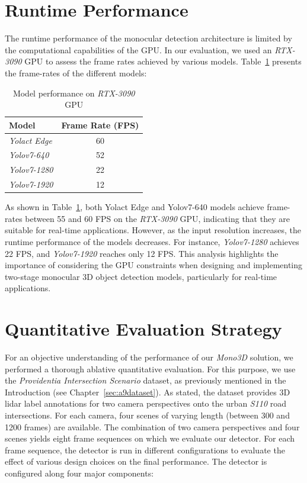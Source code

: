 
\section{Runtime Performance}
\label{sec:performance}

The runtime performance of the monocular detection architecture is limited by the computational capabilities of the GPU. In our evaluation, we used an \textit{RTX-3090} GPU to assess the frame rates achieved by various models.
Table~\ref{tbl:gpu-performance} presents the frame-rates of the different models:

\begin{table}[ht]
\centering
\caption{Model performance on \textit{RTX-3090} GPU}
\begin{tabular}{|l|c|}
\hline
\textbf{Model} & \textbf{Frame Rate (FPS)} \\
\hline
\textit{Yolact Edge} & 60 \\
\textit{Yolov7-640} & 52 \\
\textit{Yolov7-1280} & 22 \\
\textit{Yolov7-1920} & 12 \\
\hline
\end{tabular}
\label{tbl:gpu-performance}
\end{table}

As shown in Table~\ref{tbl:gpu-performance}, both Yolact Edge and Yolov7-640 models achieve frame-rates between 55 and 60 FPS on the \textit{RTX-3090} GPU, indicating that they are suitable for real-time applications.
However, as the input resolution increases, the runtime performance of the models decreases.
For instance, \textit{Yolov7-1280} achieves 22 FPS, and \textit{Yolov7-1920} reaches only 12 FPS.
This analysis highlights the importance of considering the GPU constraints when designing and implementing two-stage monocular 3D object detection models, particularly for real-time applications.


\section{Quantitative Evaluation Strategy}
\label{sec:quant}

For an objective understanding of the performance of our \textit{Mono3D} solution, we performed a thorough ablative quantitative evaluation.
For this purpose, we use the \textit{Providentia Intersection Scenario} dataset, as previously mentioned in the Introduction (see Chapter~\ref{sec:a9dataset}).
As stated, the dataset provides 3D lidar label annotations for two camera perspectives onto the urban \textit{S110} road intersections.
For each camera, four scenes of varying length (between 300 and 1200 frames) are available.
The combination of two camera perspectives and four scenes yields eight frame sequences on which we evaluate our detector.
For each frame sequence, the detector is run in different configurations to evaluate the effect of various design choices on the final performance.
The detector is configured along four major components:

